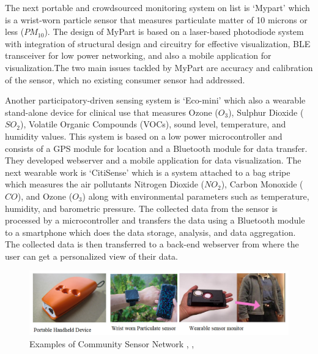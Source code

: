 The next portable and crowdsourced monitoring system on list is \lq{Mypart}\rq \cite{Tian2016} which is a wrist-worn particle sensor that measures particulate matter of 10 microns or less ($PM_{10}$). The design of MyPart is based on a laser-based photodiode system with integration of structural design and circuitry for effective visualization, BLE transceiver for low power networking, and also a mobile application for visualization.The two main issues tackled by MyPart are accuracy and calibration of the sensor, which no existing consumer sensor had addressed.



Another participatory-driven sensing system is \lq{Eco-mini}\rq \cite{Fletcher2015} which also a wearable stand-alone device for clinical use that measures Ozone ($O_{3}$), Sulphur Dioxide ($SO_{2}$), Volatile Organic Compounds (VOCs), sound level, temperature, and humidity values. This system is based on a low power microcontroller and consists of a GPS module for location and a Bluetooth module for data transfer. They developed  webserver and a mobile application for data visualization. The next wearable work is \lq{CitiSense}\rq \cite{Zappi2012} which is a system attached to a bag stripe which measures the air pollutants Nitrogen Dioxide ($NO_{2}$), Carbon Monoxide ($CO$), and Ozone  ($O_{3}$) along with environmental parameters such as temperature, humidity, and barometric pressure. The collected data from the sensor is processed by a microcontroller and transfers the data using a Bluetooth module to a smartphone which does the data storage, analysis, and data aggregation. The collected data is then transferred to a back-end webserver from where the user can get a personalized view of their data.




\begin{figure}[h!]
  \begin{center}
  \includegraphics[scale=0.80]{./images/figure41.png}
  \end{center}
 
  \caption{Examples of Community Sensor Network \cite{Tian2016}, \cite{Dutta2009}, \cite{Fletcher2015} }
  
  \label{CSN}
\end{figure}
 
